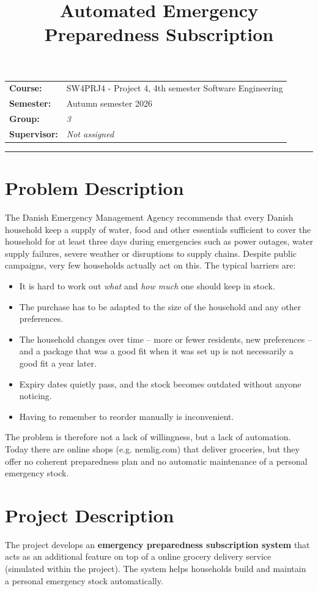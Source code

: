 \documentclass[11pt,a4paper]{article}
\title{\textbf{Automated Emergency Preparedness Subscription}}
\author{}
\date{}
\begin{document}
\maketitle
\vspace{-2\baselineskip}
\begin{center}
\begin{tabular}{@{}ll@{}}
\textbf{Course:}     & SW4PRJ4 - Project 4, 4th semester Software Engineering \\
\textbf{Semester:}   & Autumn semester 2026 \\
\textbf{Group:}      & \textit{3} \\
\textbf{Supervisor:} & \textit{Not assigned} \\
\end{tabular}
\end{center}
\hrule
\vspace{1\baselineskip}
\section*{Problem Description}
The Danish Emergency Management Agency recommends that every Danish household keep a
supply of water, food and other essentials sufficient to cover the household for at
least three days during emergencies such as power outages, water supply failures,
severe weather or disruptions to supply chains. Despite public campaigns, very few
households actually act on this. The typical barriers are:
\begin{itemize}[nosep]
  \item It is hard to work out \emph{what} and \emph{how much} one should keep in stock.
  \item The purchase has to be adapted to the size of the household and any other preferences.
  \item The household changes over time -- more or fewer residents, new preferences -- and a package that was a good fit when it was set up is not necessarily a good fit a year later.
  \item Expiry dates quietly pass, and the stock becomes outdated without anyone noticing.
  \item Having to remember to reorder manually is inconvenient.
\end{itemize}
The problem is therefore not a lack of willingness, but a lack of automation. Today
there are online shops (e.g. nemlig.com) that deliver groceries, but they offer no
coherent preparedness plan and no automatic maintenance of a personal emergency stock.
\section*{Project Description}
The project develops an \textbf{emergency preparedness subscription system} that acts as
an additional feature on top of a online grocery delivery service (simulated within the project). The system helps
households build and maintain a personal emergency stock automatically.
\end{document}

